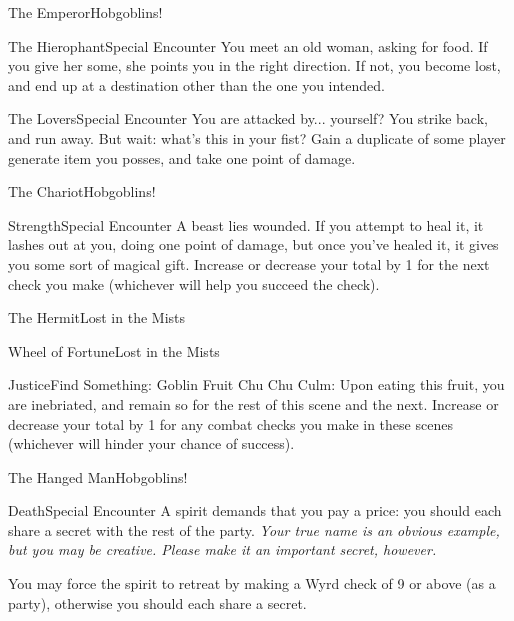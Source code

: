 \documentclass[green]{gl2018}
\begin{document}
\begin{location}{The Emperor}{Hobgoblins!}
\end{location}
\begin{location}{The Hierophant}{Special Encounter}
You meet an old woman, asking for food.  If you give her some, she points you in the right direction.  If not, you become lost, and end up at a destination other than the one you intended.
\end{location}
\begin{location}{The Lovers}{Special Encounter}
You are attacked by... yourself? You strike back, and run away. But wait: what's this in your fist? Gain a duplicate of some player generate item you posses, and take one point of damage.
\end{location}
\begin{location}{The Chariot}{Hobgoblins!}
\end{location}
\begin{location}{Strength}{Special Encounter}
A beast lies wounded.  If you attempt to heal it, it lashes out at you, doing one point of damage, but once you've healed it, it gives you some sort of magical gift. Increase or decrease your total by 1 for the next check you make (whichever will help you succeed the check). 
\end{location}
\begin{location}{The Hermit}{Lost in the Mists}
\end{location}
\begin{location}{Wheel of Fortune}{Lost in the Mists}
\end{location}
\begin{location}{Justice}{Find Something: Goblin Fruit}
Chu Chu Culm: Upon eating this fruit, you are inebriated, and remain so for the rest of this scene and the next.  Increase or decrease your total by 1 for any combat checks you make in these scenes (whichever will hinder your chance of success).
\end{location}
\begin{location}{The Hanged Man}{Hobgoblins!}
\end{location}
\begin{location}{Death}{Special Encounter}
A spirit demands that you pay a price: you should each share a secret with the rest of the party.  {\em Your true name is an obvious example, but you may be creative.  Please make it an important secret, however.}

You may force the spirit to retreat by making a Wyrd check of 9 or above (as a party), otherwise you should each share a secret.
\end{location}
\end{document}
